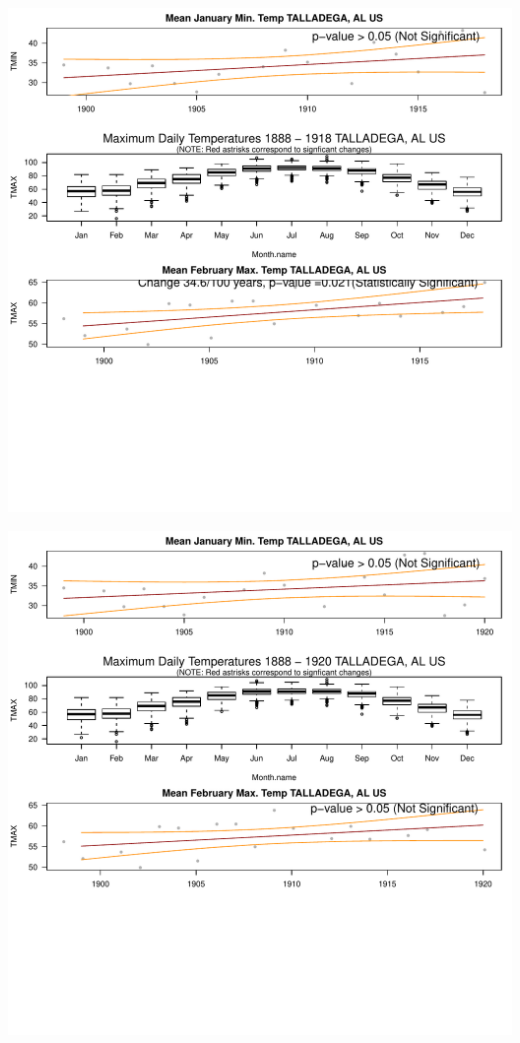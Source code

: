 \documentclass{article}\usepackage[]{graphicx}\usepackage[]{color}
\makeatletter
\def\maxwidth{ %
  \ifdim\Gin@nat@width>\linewidth
    \linewidth
  \else
    \Gin@nat@width
  \fi
}
\newenvironment{knitrout}{}{} %
\makeatother
\begin{document}
\begin{knitrout}
\includegraphics[width=\maxwidth]{figure/static_template-5} 

\includegraphics[width=\maxwidth]{figure/static_template-6} 


\end{knitrout}
\end{document}
